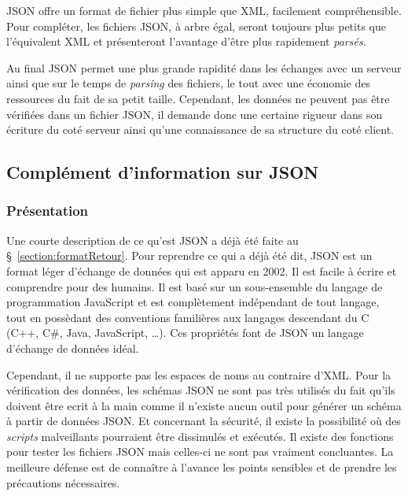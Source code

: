 JSON offre un format de fichier plus simple que XML, facilement compr\'ehensible.
Pour compl\'eter, les fichiers JSON, \`a arbre \'egal, seront toujours plus petits que l'\'equivalent XML et pr\'esenteront l'avantage d'\^etre plus rapidement \textit{pars\'es}.

Au final JSON permet une plus grande rapidit\'e dans les \'echanges avec un serveur ainsi que sur le temps de \textit{parsing} des fichiers, le tout avec une \'economie des ressources du fait de sa petit taille.
Cependant, les donn\'ees ne peuvent pas \^etre v\'erifi\'ees dans un fichier JSON, il demande donc une certaine rigueur dans son \'ecriture du cot\'e serveur ainsi qu'une connaissance de sa structure du cot\'e client.

\subsection{Compl\'ement d'information sur JSON}

\subsubsection{Pr\'esentation}

Une courte description de ce qu'est JSON a d\'ej\`a \'et\'e faite au \S~\ref{section:formatRetour}.
Pour reprendre ce qui a d\'ej\`a \'et\'e dit, JSON est un format l\'eger d'\'echange de donn\'ees qui est apparu en 2002.
Il est facile \`a \'ecrire et comprendre pour des humains.
Il est bas\'e sur un sous-ensemble du langage de programmation JavaScript et est compl\`etement ind\'ependant de tout langage, tout en poss\`edant des conventions famili\`eres aux langages descendant du C (C++, C\#, Java, JavaScript, \ldots).
Ces propri\'et\'es font de JSON un langage d'\'echange de donn\'ees id\'eal.

Cependant, il ne supporte pas les espaces de noms au contraire d'XML.
Pour la v\'erification des donn\'ees, les sch\'emas JSON ne sont pas tr\`es utilis\'es du fait qu'ils doivent \^etre ecrit \`a la main comme il n'existe aucun outil pour g\'en\'erer un sch\'ema \`a partir de donn\'ees JSON.
Et concernant la s\'ecurit\'e, il existe la possibilit\'e o\`u des \textit{scripts} malveillants pourraient \^etre dissimul\'es et ex\'ecut\'es.
Il existe des fonctions pour tester les fichiers JSON mais celles-ci ne sont pas vraiment concluantes.
La meilleure d\'efense est de conna\^itre \`a l'avance les points sensibles et de prendre les pr\'ecautions n\'ecessaires.

